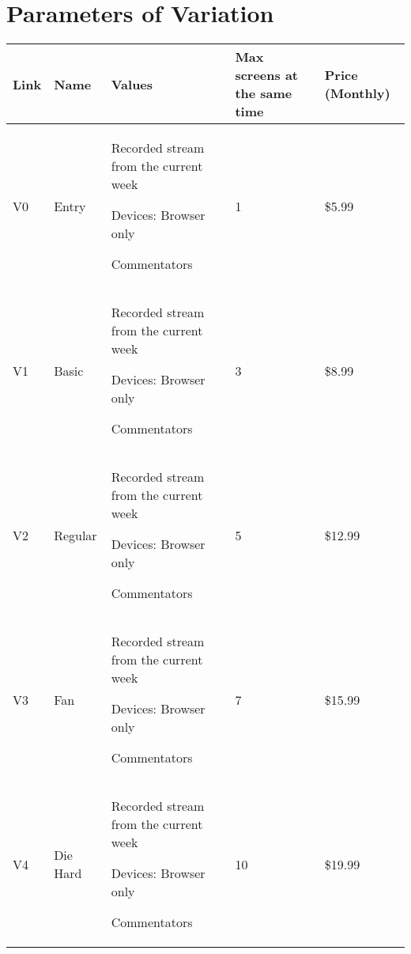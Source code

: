 \section{Parameters of Variation}
\begin{center}
\begin{tabular}{p{}p{}p{}p{}p{}}
\hline
	Link & Name & Values & Max screens at the same time & Price (Monthly)  \\ 
\hline
V0 & Entry & \begin{packed_enum}
	\small{
		\item Recorded stream from the current week
		\item Devices: Browser only
		\item Commentators
	}
\end{packed_enum} & 1 & \$5.99 \\ 
\hline
V1 & Basic & \begin{packed_enum}
	\small{
		\item Recorded stream from the current week
		\item Devices: Browser only
		\item Commentators
	}
\end{packed_enum} & 3 & \$8.99 \\ 
\hline
V2 & Regular & \begin{packed_enum}
	\small{
		\item Recorded stream from the current week
		\item Devices: Browser only
		\item Commentators
	}
\end{packed_enum} & 5 & \$12.99 \\ 
\hline
V3 & Fan & \begin{packed_enum}
	\small{
		\item Recorded stream from the current week
		\item Devices: Browser only
		\item Commentators
	}
\end{packed_enum} & 7 & \$15.99 \\ 
\hline
V4 & Die Hard & \begin{packed_enum}
	\small{
		\item Recorded stream from the current week
		\item Devices: Browser only
		\item Commentators
	}
\end{packed_enum} & 10 & \$19.99 \\ 
\hline
\end{tabular}
\end{center}